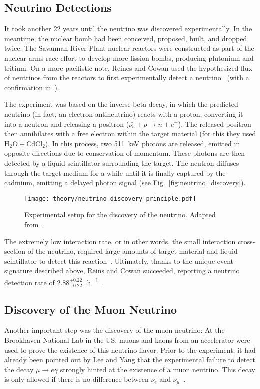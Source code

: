 \subsection{Neutrino Detections}
It took another 22 years until the neutrino was discovered experimentally. In the meantime, the nuclear bomb had been conceived, proposed, built, and dropped twice. The Savannah River Plant nuclear reactors were constructed as part of the nuclear arms race effort to develop more fission bombs, producing plutonium and tritium. On a more pacifistic note, Reines and Cowan used the hypothesized flux of neutrinos from the reactors to first experimentally detect a neutrino~\cite{Reines1956} (with a confirmation in~).

The experiment was based on the inverse beta decay, in which the predicted neutrino (in fact, an electron antineutrino) reacts with a proton, converting it into a neutron and releasing a positron ($\bar{\nu_e} + p \rightarrow n + e^+$). The released positron then annihilates with a free electron within the target material (for this they used $\text{H}_2\text{O} + \text{CdCl}_2$). In this process, two \SI{511}{\kilo\eV} photons are released, emitted in opposite directions due to conservation of momentum. These photons are then detected by a liquid scintillator surrounding the target. The neutron diffuses through the target medium for a while until it is finally captured by the cadmium, emitting a delayed photon signal (see Fig.~\ref{fig:neutrino_discovery}).

\begin{figure}[htb]
  \texttt{[image: theory/neutrino\_discovery\_principle.pdf]}
  \caption[Neutrino discovery schematic]{Experimental setup for the discovery of the neutrino. Adapted from~\cite{Reines1956}.}
\end{figure}

The extremely low interaction rate, or in other words, the small interaction cross-section of the neutrino, required large amounts of target material and liquid scintillator to detect this reaction~\cite{Giunti2007}. Ultimately, thanks to the unique event signature described above, Reins and Cowan succeeded, reporting a neutrino detection rate of $2.88^{+0.22}_{-0.22}$\,\si{\ct\per\hour}~\cite{Reines1956}.

\subsection{Discovery of the Muon Neutrino}
Another important step was the discovery of the muon neutrino: At the Brookhaven National Lab in the US, muons and kaons from an accelerator were used to prove the existence of this neutrino flavor. Prior to the experiment, it had already been pointed out by Lee and Yang that the experimental failure to detect the decay $\mu \rightarrow e \gamma$ strongly hinted at the existence of a muon neutrino. This decay is only allowed if there is no difference between $\nu_e$ and $\nu_\mu$~.

